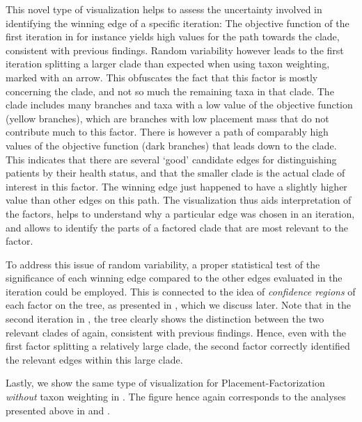 This novel type of visualization helps to assess the uncertainty
involved in identifying the winning edge of a specific iteration:
The objective function of the first iteration in  for instance
yields high values for the path towards the  clade, consistent with previous findings.
Random variability however leads to the first iteration splitting a larger clade
than expected when using taxon weighting, marked with an arrow.
This obfuscates the fact that this factor is mostly concerning the  clade,
and not so much the remaining taxa in that clade.
The clade includes many branches and taxa with a low value of the objective function (yellow branches),
which are branches with low placement mass that do not contribute much to this factor.
There is however a path of comparably high values of the objective function (dark branches)
that leads down to the  clade.
This indicates that there are several `good' candidate edges for distinguishing patients by their health status,
and that the smaller  clade is the actual clade of interest in this factor.
The winning edge just happened to have a slightly higher value than other edges on this path.
The visualization thus aids interpretation of the factors,
helps to understand why a particular edge was chosen in an iteration,
and allows to identify the parts of a factored clade that are most relevant to the factor.

To address this issue of random variability, a proper statistical test of the significance of each winning edge
compared to the other edges evaluated in the iteration could be employed.
This is connected to the idea of \emph{confidence regions} of each factor on the tree,
as presented in \cite{Washburne2019}, which we discuss later.
Note that in the second iteration in ,
the tree clearly shows the distinction between the two relevant clades of  again,
consistent with previous findings.
Hence, even with the first factor splitting a relatively large clade,
the second factor correctly identified the relevant edges within this large clade.

Lastly, we show the same type of visualization for Placement-Factorization \emph{without} taxon weighting
in .
The figure hence again corresponds to the analyses presented above
in  and .

